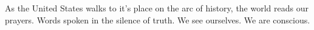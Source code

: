 

As the United States walks to it's place on the arc of history, the
world reads our prayers.  Words spoken in the silence of truth.  We
see ourselves.  We are conscious.

\bye
